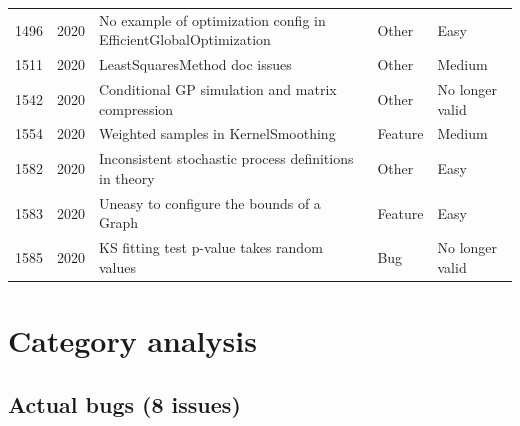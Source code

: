 \documentclass[a4paper,11pt]{article}
\begin{document}
\begin{longtable}{rrp{7.1cm}ll}
1496 & 2020 & No example of optimization config in EfficientGlobalOptimization & Other & Easy \\
1511 & 2020 & LeastSquaresMethod doc issues & Other & Medium \\
1542 & 2020 & Conditional GP simulation and matrix compression & Other & No longer valid \\
1554 & 2020 & Weighted samples in KernelSmoothing & Feature & Medium \\
1582 & 2020 & Inconsistent stochastic process definitions in theory & Other & Easy \\
1583 & 2020 & Uneasy to configure the bounds of a Graph & Feature & Easy \\
1585 & 2020 & KS fitting test p-value takes random values & Bug & No longer valid \\
\bottomrule
\end{longtable}
\normalsize

\section{Category analysis}

\subsection{Actual bugs (8 issues)}
\end{document}
